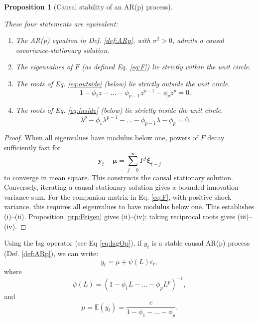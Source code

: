\documentclass[
  11pt,
]{book}
\providecommand{\tightlist}{%
  \setlength{\itemsep}{0pt}\setlength{\parskip}{0pt}}
\newtheorem{proposition}{Proposition}[chapter]
\theoremstyle{definition}
\theoremstyle{definition}
\theoremstyle{definition}
\theoremstyle{definition}
\theoremstyle{remark}
\begin{document}
\begin{proposition}[Causal stability of an AR(p) process]
\protect\hypertarget{prp:stability}{}\label{prp:stability}

These four statements are equivalent:

\begin{enumerate}
\def\labelenumi{\roman{enumi}.}
\tightlist
\item
  The AR(p) equation in Def. \ref{def:ARp}, with \(\sigma^2>0\), admits a causal covariance-stationary solution.
\item
  The eigenvalues of \(F\) (as defined Eq. \eqref{eq:F}) lie strictly within the unit circle.
\item
  The roots of Eq. \eqref{eq:outside} (below) lie strictly outside the unit circle.
  \begin{equation}
  1 - \phi_1 z - \dots - \phi_{p-1}z^{p-1} - \phi_p z^p = 0.\label{eq:outside}
  \end{equation}
\item
  The roots of Eq. \eqref{eq:inside} (below) lie strictly inside the unit circle.
  \begin{equation}
  \lambda^p - \phi_1 \lambda^{p-1} - \dots - \phi_{p-1}\lambda - \phi_p = 0.\label{eq:inside}
  \end{equation}
\end{enumerate}

\end{proposition}

\begin{proof}
When all eigenvalues have modulus below one, powers of \(F\) decay sufficiently fast for
\[
\mathbf{y}_t-\boldsymbol\mu=\sum_{j=0}^{\infty}F^j\boldsymbol\xi_{t-j}
\]
to converge in mean square. This constructs the causal stationary solution. Conversely, iterating a causal stationary solution gives a bounded innovation-variance sum. For the companion matrix in Eq. \eqref{eq:F}, with positive shock variance, this requires all eigenvalues to have modulus below one. This establishes (i)--(ii). Proposition \ref{prp:Feigen} gives (ii)--(iv); taking reciprocal roots gives (iii)--(iv).
\end{proof}

Using the lag operator (see Eq \eqref{eq:lagOp}), if \(y_t\) is a stable causal AR(p) process (Def. \ref{def:ARp}), we can write:
\[
y_t = \mu + \psi(L)\varepsilon_t,
\]
where
\begin{equation}
\psi(L) = (1 - \phi_1 L - \dots - \phi_p L^p)^{-1},
\end{equation}
and
\begin{equation}
\mu = \mathbb{E}(y_t) = \dfrac{c}{1-\phi_1 -\dots - \phi_p}.\label{eq:EAR}
\end{equation}
\end{document}
